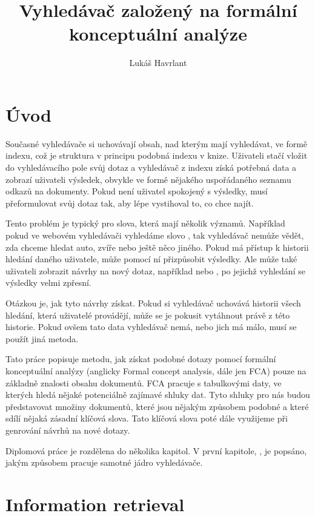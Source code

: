 \documentclass[12pt]{article}
\title{Vyhledávač založený na formální konceptuální analýze}
\author{Lukáš Havrlant}
\begin{document}
\maketitle
\newpage


\section*{Úvod}

Současné vyhledávače si uchovávají obsah, nad kterým mají vyhledávat, ve formě indexu, což je struktura v principu podobná indexu v knize. Uživateli stačí vložit do vyhledávacího pole svůj dotaz a vyhledávač z indexu získá potřebná data a zobrazí uživateli výsledek, obvykle ve formě nějakého uspořádaného seznamu odkazů na dokumenty. Pokud není uživatel spokojený s výsledky, musí přeformulovat svůj dotaz tak, aby lépe vystihoval to, co chce najít. 

Tento problém je typický pro slova, která mají několik významů. Například pokud ve webovém vyhledávači vyhledáme slovo , tak vyhledávač nemůže vědět, zda chceme hledat auto, zvíře nebo ještě něco jiného. Pokud má přístup k historii hledání daného uživatele, může pomocí ní přizpůsobit výsledky. Ale může také uživateli zobrazit návrhy na nový dotaz, například  nebo , po jejichž vyhledání se výsledky velmi zpřesní. 

Otázkou je, jak tyto návrhy získat. Pokud si vyhledávač uchovává historii všech hledání, která uživatelé provádějí, může se je pokusit vytáhnout právě z této historie. Pokud ovšem tato data vyhledávač nemá, nebo jich má málo, musí se použít jiná metoda. 

Tato práce popisuje metodu, jak získat podobné dotazy pomocí formální konceptuální analýzy (anglicky Formal concept analysis, dále jen FCA) pouze na základně znalosti obsahu dokumentů. FCA pracuje s tabulkovými daty, ve kterých hledá nějaké potenciálně zajímavé shluky dat. Tyto shluky pro nás budou představovat množiny dokumentů, které jsou nějakým způsobem podobné a které sdílí nějaká zásadní klíčová slova. Tato klíčová slova poté dále využijeme při genrování návrhů na nové dotazy. 

Diplomová práce je rozdělena do několika kapitol. V první kapitole, , je popsáno, jakým způsobem pracuje samotné jádro vyhledávače. 

\newpage
\section{Information retrieval}
\end{document}
